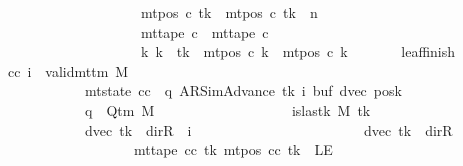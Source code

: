 \begin{isabellebody}
\ \ \ \ \ \ \ \ \ \ \ \ \ \ \ \ \ \ \ \ \ \ \ \ \ \ {\isasymand}\ mt{\isacharunderscore}{\kern0pt}pos\ c{\isacharprime}{\kern0pt}\ tk\ {\isacharequal}{\kern0pt}\ mt{\isacharunderscore}{\kern0pt}pos\ c{}{\isacharprime}{\kern0pt}\ tk\ {\isacharminus}{\kern0pt}\ n\isanewline
\ \ \ \ \ \ \ \ \ \ \ \ \ \ \ \ \ \ \ \ \ \ \ \ \ \ {\isasymand}\ mt{\isacharunderscore}{\kern0pt}tape\ c{\isacharprime}{\kern0pt}\ {\isacharequal}{\kern0pt}\ mt{\isacharunderscore}{\kern0pt}tape\ c{}{\isacharprime}{\kern0pt}\isanewline
\ \ \ \ \ \ \ \ \ \ \ \ \ \ \ \ \ \ \ \ \ \ \ \ \ \ {\isasymand}\ {\isacharparenleft}{\kern0pt}{\isasymforall}k{\isacharprime}{\kern0pt}{\isachardot}{\kern0pt}\ k{\isacharprime}{\kern0pt}\ {\isasymnoteq}\ tk\ {\isasymlongrightarrow}\ mt{\isacharunderscore}{\kern0pt}pos\ c{\isacharprime}{\kern0pt}\ k{\isacharprime}{\kern0pt}\ {\isacharequal}{\kern0pt}\ mt{\isacharunderscore}{\kern0pt}pos\ c{}{\isacharprime}{\kern0pt}\ k{\isacharprime}{\kern0pt}{\isacharparenright}{\kern0pt}{\isachardoublequoteclose}\isanewline
\ \ \ \ \ \ \ leaf{\isacharunderscore}{\kern0pt}finish{\isacharcolon}{\kern0pt}\isanewline
\ \ \ \ \ \ \ \ {\isachardoublequoteopen}{\isasymAnd}cc\ i{\isachardot}{\kern0pt}\ {\isasymlbrakk}\ valid{\isacharunderscore}{\kern0pt}mttm\ M{\isacharsemicolon}{\kern0pt}\isanewline
\ \ \ \ \ \ \ \ \ \ \ \ \ \ \ \ \ \ \ mt{\isacharunderscore}{\kern0pt}state\ cc\ {\isacharequal}{\kern0pt}\ {\isacharparenleft}{\kern0pt}q{\isacharcomma}{\kern0pt}\ AR{\isacharunderscore}{\kern0pt}SimAdvance{\isacharcomma}{\kern0pt}\ tk{\isacharcomma}{\kern0pt}\ i{\isacharcomma}{\kern0pt}\ buf{\isacharcomma}{\kern0pt}\ dvec{\isacharcomma}{\kern0pt}\ posk{\isacharparenright}{\kern0pt}{\isacharsemicolon}{\kern0pt}\isanewline
\ \ \ \ \ \ \ \ \ \ \ \ \ \ \ \ \ \ \ q\ {\isasymin}\ Q{\isacharunderscore}{\kern0pt}tm\ M{\isacharsemicolon}{\kern0pt}\isanewline
\ \ \ \ \ \ \ \ \ \ \ \ \ \ \ \ \ \ \ is{\isacharunderscore}{\kern0pt}last{\isacharunderscore}{\kern0pt}k\ M\ tk{\isacharsemicolon}{\kern0pt}\isanewline
\ \ \ \ \ \ \ \ \ \ \ \ \ \ \ \ \ \ \ {\isacharparenleft}{\kern0pt}dvec\ tk\ {\isacharequal}{\kern0pt}\ dir{\isachardot}{\kern0pt}R\ {\isasymand}\ i\ {\isacharequal}{\kern0pt}\ {}{\isacharparenright}{\kern0pt}\isanewline
\ \ \ \ \ \ \ \ \ \ \ \ \ \ \ \ \ \ \ \ \ {\isasymor}\ {\isacharparenleft}{\kern0pt}dvec\ tk\ {\isasymnoteq}\ dir{\isachardot}{\kern0pt}R\isanewline
\ \ \ \ \ \ \ \ \ \ \ \ \ \ \ \ \ \ \ \ \ \ \ \ \ {\isasymand}\ mt{\isacharunderscore}{\kern0pt}tape\ cc\ tk\ {\isacharparenleft}{\kern0pt}mt{\isacharunderscore}{\kern0pt}pos\ cc\ tk{\isacharparenright}{\kern0pt}\ {\isasymnoteq}\ LE{}\isanewline

\end{isabellebody}
